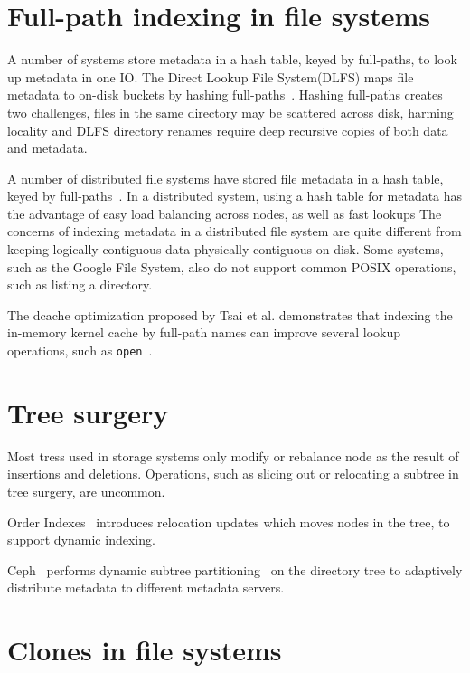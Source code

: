 \section{Full-path indexing in file systems}
A number of systems store metadata in a hash table, keyed by full-paths, to look
up metadata in one IO.
The Direct Lookup File System(DLFS) maps file metadata to on-disk buckets by
hashing full-paths~\citep{dlfs}.
Hashing full-paths creates two challenges, files in the same directory may be
scattered across disk, harming locality and DLFS directory renames require deep
recursive copies of both data and metadata.

A number of distributed file systems have stored file metadata in a hash table,
keyed by full-paths~\citep{gfs,nsidw,rdfs}.
In a distributed system, using a hash table for metadata has the advantage of
easy load balancing across nodes, as well as fast lookups
The concerns of indexing metadata in a distributed file system are quite
different from keeping logically contiguous data physically contiguous on disk.
Some systems, such as the Google File System, also do not support common POSIX
operations, such as listing a directory.

The dcache optimization proposed by Tsai et al. demonstrates that
indexing the in-memory kernel cache by full-path names can improve several
lookup operations, such as \texttt{open}~\citep{dcache}.

\section{Tree surgery}

Most tress used in storage systems only modify or rebalance node as the result
of insertions and deletions.
Operations, such as slicing out or relocating a subtree in tree surgery,
are uncommon.

Order Indexes~\citep{orderindex} introduces relocation updates which moves nodes
in the tree, to support dynamic indexing.

Ceph~\citep{ceph} performs dynamic subtree partitioning~\citep{cephtree} on the
directory tree to adaptively distribute metadata to different metadata servers.

\section{Clones in file systems}

